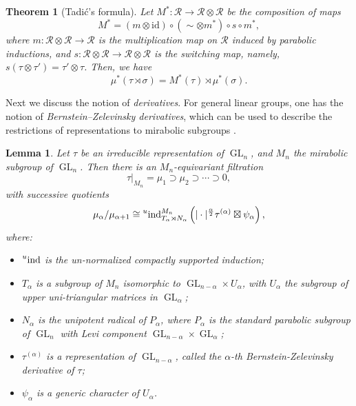 \documentclass[11pt,letterpaper]{amsart}
\theoremstyle{plain}
\newcounter{theorem}[section]
\numberwithin{theorem}{section}
\numberwithin{equation}{subsection}
\newtheorem{Thm}[theorem]{Theorem}
\newtheorem{Lem}[theorem]{Lemma}
\theoremstyle{remark}
\newcommand{\GL}{\operatorname{GL}}
\newcommand{\ind}{\operatorname{ind}}
\def\calR{\mathcal{R}}
\begin{document}
\begin{Thm}[Tadi\'c's formula]\label{tadic}
Let \(M^*:\calR\rightarrow \calR\otimes \calR\) be the composition of maps
\[
    M^*=(m\otimes\mathrm{id})\circ( \sim\otimes m^*)\circ s\circ m^*,
\] 
where \(m:\calR\otimes\calR\rightarrow\calR\) is the multiplication map on \(\calR\) induced by parabolic inductions, and \(s:\calR\otimes\calR\rightarrow\calR\otimes\calR\) is the switching map, namely, $s\left(\tau\otimes \tau'\right) = \tau'\otimes\tau$. Then, we have
\[
    \mu^*(\tau\rtimes\sigma)=M^*(\tau)\rtimes\mu^*(\sigma).
\]
\end{Thm}


Next we discuss the notion of \emph{derivatives}. For general linear groups, one has the notion of \emph{Bernstein--Zelevinsky derivatives}, which can be used to describe the restrictions of representations to mirabolic subgroups \cite[Prop. 3.2, 3.5]{MR579172}.

\begin{Lem}\label{L:RestrictionToMirabolic}
Let $\tau$ be an irreducible representation of $\GL_n$, and $M_n$ the mirabolic subgroup of $\GL_n$. Then there is an $M_n$-equivariant filtration
\[
    \tau\big|_{M_n} = \mu_1 \supset \mu_2 \supset \cdots\supset 0,
\]
with successive quotients
\[
    \mu_\alpha/\mu_{\alpha+1} \cong \prescript{u}{}{\ind}_{T_\alpha\rtimes N_\alpha}^{M_n}\left(|\cdot|^{\frac{\alpha}{2}}\tau^{(\alpha)}\boxtimes\psi_\alpha\right),
\]
where:
\begin{itemize}
    \item $\prescript{u}{}{\ind}$ is the un-normalized compactly supported induction;
    \vskip 5pt
    
    \item $T_\alpha$ is a subgroup of $M_n$ isomorphic to $\GL_{n-\alpha}\times U_\alpha$, with $U_\alpha$ the subgroup of upper uni-triangular matrices in $\GL_\alpha$;
    \vskip 5pt

    \item $N_\alpha$ is the unipotent radical of $P_\alpha$, where $P_\alpha$ is the standard parabolic subgroup of $\GL_{n}$ with Levi component $\GL_{n-\alpha}\times \GL_\alpha$;
    \vskip 5pt

    \item $\tau^{(\alpha)}$ is a representation of $\GL_{n-\alpha}$, called the $\alpha$-th Bernstein-Zelevinsky derivative of $\tau$;
    \vskip 5pt

    \item $\psi_\alpha$ is a generic character of $U_\alpha$.
\end{itemize}
\end{Lem}
\end{document}
